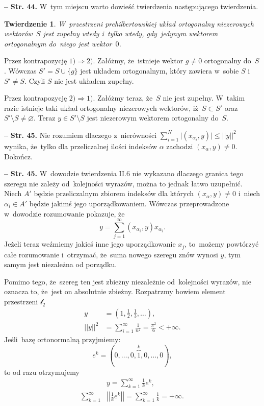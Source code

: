 \documentclass[a4paper,11pt]{article}
\newtheorem{twr}{Twierdzenie}
\let\emptyset\varnothing
\newcommand{\ld}{\ldots}
\newcommand{\fr}{\frac}
\newcommand{\tfr}{\tfrac}
\newcommand{\mc}{\mathcal}
\newcommand{\Ra}{\Rightarrow}
\newcommand{\wtw}{wtedy i~tylko wtedy}
\newcommand{\al}{\alpha}
\newcommand{\lc}{\mc{l}}
\newcommand{\set}[1]{\{ #1 \}}
\newcommand{\es}{\emptyset}
\newcommand{\subs}{\subset}
\newcommand{\setm}{\setminus}
\newcommand{\Sum}{\sum\limits}
\providecommand{\absj}[1]{\lvert #1 \rvert}
\newcommand{\norm}[1]{\left|\left| #1 \right|\right|}
\newcommand{\tb}{\textbf}
\newcommand{\noi}{\noindent}
\newcommand{\start}{\noi \tb{--} {}}
\newcommand{\Str}[1]{\tb{Str. #1.}}
\newcommand{\Dok}{{\color{red} Dokończ.}}
\begin{document}
\start \Str{44} W~tym miejscu warto dowieść twierdzenia następującego
twierdzenia.
\begin{twr}
  W~przestrzeni prehilbertowskiej układ ortogonalny niezerowych
  wektorów~$S$ jest zupełny \wtw, gdy~jedynym wektorem ortogonalnym
  do~niego jest wektor~$0$.
\end{twr}

Przez kontrapozycję $1) \Ra 2)$. Załóżmy, że~istnieje wektor $g \neq 0$
ortogonalny do~$S$. Wówczas $S' = S \cup \set{ g }$ jest układem
ortogonalnym, który zawiera w~sobie $S$ i~$S' \neq S$. Czyli $S$ nie
jest układem zupełny.

Przez kontrapozycję $2) \Ra 1)$. Załóżmy teraz, że~$S$ nie jest zupełny.
W~takim razie istnieje taki układ ortogonalny niezerowych wektorów,
iż~$S \subs S'$ oraz $S' \setm S \neq \es$. Teraz $y \in S' \setm S$
jest niezerowym wektorem ortogonalny %
do~$S$.

\start \Str{45} Nie rozumiem dlaczego z~nierówności
$\sum_{ i = 1 }^{ N } \absj{ ( x_{ \al_{ i } }, y ) } \leq \norm{ y
}^{ 2 }$ wynika, że~tylko dla przeliczalnej ilości indeksów $\al$
zachodzi $( x_{ \al }, y ) \neq 0$. \Dok

\start \Str{45} W~dowodzie twierdzenia II.6 nie wykazano dlaczego
granica tego szeregu nie zależy od~kolejności wyrazów, można to jednak
łatwo uzupełnić. Niech $A'$ będzie przeliczalnym zbiorem indeksów dla
których $( x_{ \al }, y ) \neq 0$ i~niech $\al_{ i } \in A'$ będzie
jakimś jego uporządkowaniem. Wówczas przeprowadzone w~dowodzie
rozumowanie pokazuje, że
\begin{equation}
  y = \Sum_{ j = 1 }^{ \infty } ( x_{ \al_{ i } }, y ) x_{ \al_{ i } }.
\end{equation}
Jeżeli teraz weźmiemy jakieś inne jego uporządkowanie $x_{ j }$,
to~możemy powtórzyć całe rozumowanie i~otrzymać, że~suma nowego
szeregu znów wynosi $y$, tym samym jest niezależna od porządku.

Pomimo tego, że~szereg ten jest zbieżny niezależnie od~kolejności
wyrazów, nie oznacza to, że~jest on absolutnie zbieżny. Rozpatrzmy
bowiem element przestrzeni $\lc_{ 2 }$
\begin{align*}
  y &= ( 1, \tfr{ 1 }{ 2 }, \tfr{ 1 }{ 3 },\ld ), \\
  \norm{ y }^{ 2 } &= \Sum_{ i = 1 }^{ \infty } \fr{ 1 }{ n^{ 2 } }
                     = \fr{ \pi^{ 2 } }{ 6 } < +\infty.
\end{align*}
Jeśli~bazę ortonormalną przyjmiemy:
\begin{equation*}
  e^{ k } = ( 0, \ld, 0, \overbrace{ 1 }^{ k }, 0, \ld, 0),
\end{equation*}
to od razu otrzymujemy
\begin{align*}
  &y = \Sum_{ k = 1 }^{ \infty } \tfr{ 1 }{ k } e^{ k }, \\
  \Sum_{ k = 1 }^{ \infty } &\norm{ \tfr{ 1 }{ k } e^{ k } }
                              = \Sum_{ k = 1 }^{ \infty } \tfr{ 1 }{ k }
                              = +\infty.
\end{align*}
\end{document}
